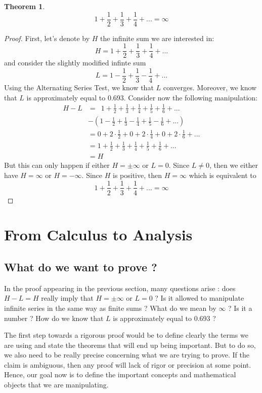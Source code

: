 \documentclass[12pt]{article}
\theoremstyle{definition}
\newtheorem*{theorem}{Theorem}
\begin{document}
\begin{theorem}
    $$ 1 + \frac{1}{2} + \frac{1}{3} + \frac{1}{4} + ... = \infty$$
\end{theorem}

\begin{proof}
    First, let's denote by $H$ the infinite sum we are interested in:
    $$H = 1 + \frac{1}{2} + \frac{1}{3} + \frac{1}{4} + ...$$
    and consider the slightly modified infinte sum
    $$L = 1 - \frac{1}{2} + \frac{1}{3} - \frac{1}{4} + ...$$
    Using the Alternating Series Test, we know that $L$ converges. Moreover, we know that $L$ is approximately equal to 0.693. Consider now the following manipulation:
    \begin{align*}
        H - L &= \ \; 1 + \frac{1}{2} + \frac{1}{3} + \frac{1}{4} + \frac{1}{5} + \frac{1}{6} + ... \\
        & - \left(1 - \frac{1}{2} + \frac{1}{3} - \frac{1}{4} + \frac{1}{5} - \frac{1}{6} + ...\right) \\
        &= 0 + 2\cdot \frac{1}{2} + 0 + 2\cdot \frac{1}{4} + 0 + 2\cdot \frac{1}{6} + ... \\
        &= 1 + \frac{1}{2} + \frac{1}{3} + \frac{1}{4} + \frac{1}{5} + \frac{1}{6} + ... \\
        &= H
    \end{align*}
    But this can only happen if either $H = \pm \infty$ or $L = 0$. Since $L \neq 0$, then we either have $H = \infty$ or $H = -\infty$. Since $H$ is positive, then $H = \infty$ which is equivalent to
    $$ 1 + \frac{1}{2} + \frac{1}{3} + \frac{1}{4} + ... = \infty$$
\end{proof}

\section{From Calculus to Analysis}

\subsection{What do we want to prove ?}

In the proof appearing in the previous section, many questions arise : does $H - L = H$ really imply that $H = \pm \infty$ or $L = 0$ ? Is it allowed to manipulate infinite series in the same way as finite sums ? What do we mean by $\infty$ ? Is it a number ? How do we know that $L$ is approximately equal to 0.693 ? 

The first step towards a rigorous proof would be to define clearly the terms we are using and state the theorems that will end up being important. But to do so, we also need to be really precise concerning what we are trying to prove. If the claim is ambiguous, then any proof will lack of rigor or precision at some point. Hence, our goal now is to define the important concepts and mathematical objects that we are manipulating.
\end{document}
